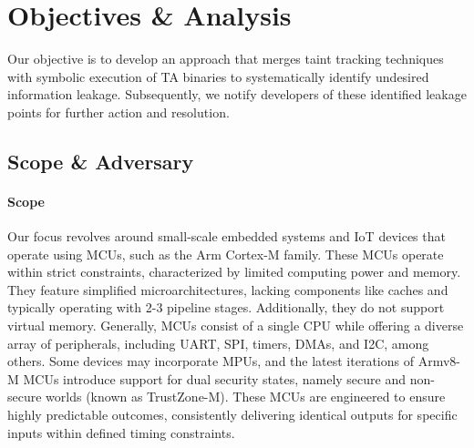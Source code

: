 \section{Objectives \& Analysis} \label{sect:design}
%

Our objective is to develop an approach that merges taint tracking techniques
with symbolic execution of \ac{TA} binaries to
systematically identify undesired information leakage. Subsequently, we
notify developers of these identified leakage points for
further action and resolution. 

\subsection{Scope \& Adversary}
%
\paragraph{\textbf{Scope}} Our focus revolves around small-scale embedded
systems and IoT devices that operate using MCUs, such as the Arm Cortex-M
family. These MCUs operate within strict constraints, characterized by
limited computing power and memory. They feature simplified
microarchitectures, lacking components like caches and typically operating
with 2-3 pipeline stages. Additionally, they do not support virtual memory.
Generally, MCUs consist of a single CPU while offering a diverse array of
peripherals, including UART, SPI, timers, DMAs, and I2C, among others. Some
devices may incorporate MPUs, and the latest iterations of Armv8-M MCUs
introduce support for dual security states, namely secure and non-secure
worlds (known as TrustZone-M). These MCUs are engineered to ensure highly
predictable outcomes, consistently delivering identical outputs for
specific inputs within defined timing constraints.

